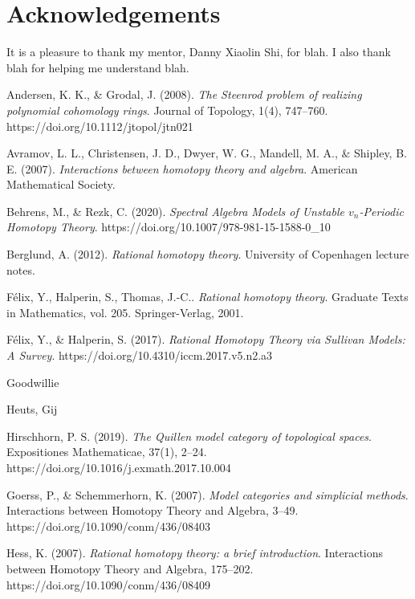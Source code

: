 \documentclass[psamsfonts]{amsart}
\theoremstyle{definition}
\theoremstyle{remark}
\numberwithin{equation}{section}
\begin{document}
\section*{Acknowledgements}

It is a pleasure to thank my mentor, Danny Xiaolin Shi, for blah. I also thank blah for helping 
me understand blah.

\newpage
\begin{thebibliography}{2}

Andersen, K. K., \& Grodal, J. (2008). \textit{The Steenrod problem of realizing polynomial cohomology rings}. Journal of Topology, 1(4), 747–760. https://doi.org/10.1112/jtopol/jtn021 

Avramov, L. L., Christensen, J. D., Dwyer, W. G., Mandell, M. A., \& Shipley, B. E. (2007). \textit{Interactions between homotopy theory and algebra}. American Mathematical Society.

Behrens, M., \& Rezk, C. (2020). \textit{Spectral Algebra Models of Unstable $v_n$-Periodic Homotopy Theory}. https://doi.org/10.1007/978-981-15-1588-0\_10 

Berglund, A. (2012). \textit{Rational homotopy theory}. University of Copenhagen lecture notes.

Félix, Y., Halperin, S., Thomas, J.-C.. \textit{Rational homotopy theory}. Graduate Texts in Mathematics, vol. 205. Springer-Verlag, 2001.

Félix, Y., \& Halperin, S. (2017). \textit{Rational Homotopy Theory via Sullivan Models: A Survey}. https://doi.org/10.4310/iccm.2017.v5.n2.a3

 Goodwillie

 Heuts, Gij

Hirschhorn, P. S. (2019). \textit{The Quillen model category of topological spaces}. Expositiones Mathematicae, 37(1), 2–24. https://doi.org/10.1016/j.exmath.2017.10.004 

Goerss, P., \& Schemmerhorn, K. (2007). \textit{Model categories and simplicial methods}. Interactions between Homotopy Theory and Algebra, 3–49. https://doi.org/10.1090/conm/436/08403 

Hess, K. (2007). \textit{Rational homotopy theory: a brief introduction}. Interactions between Homotopy Theory and Algebra, 175–202. https://doi.org/10.1090/conm/436/08409


\end{thebibliography}
\end{document}
